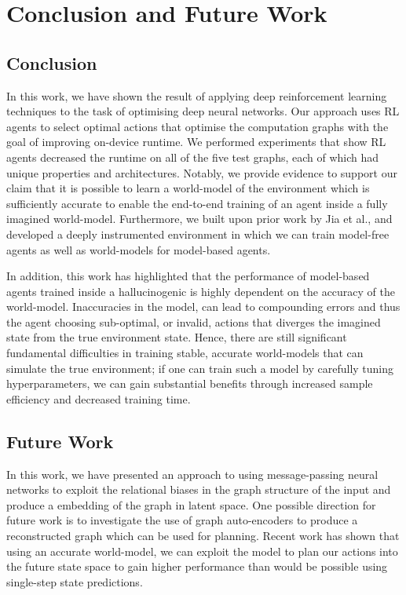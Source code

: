 \chapter{Conclusion and Future Work}

\section{Conclusion}

In this work, we have shown the result of applying deep reinforcement learning techniques to the task of optimising deep neural networks. Our approach uses RL agents to select optimal actions that optimise the computation graphs with the goal of improving on-device runtime. We performed experiments that show RL agents decreased the runtime on all of the five test graphs, each of which had unique properties and architectures. Notably, we provide evidence to support our claim that it is possible to learn a world-model of the environment which is sufficiently accurate to enable the end-to-end training of an agent inside a fully imagined world-model. Furthermore, we built upon prior work by Jia et al., and developed a deeply instrumented environment in which we can train model-free agents as well as world-models for model-based agents.

In addition, this work has highlighted that the performance of model-based agents trained inside a hallucinogenic is highly dependent on the accuracy of the world-model. Inaccuracies in the model, can lead to compounding errors and thus the agent choosing sub-optimal, or invalid, actions that diverges the imagined state from the true environment state. Hence, there are still significant fundamental difficulties in training stable, accurate world-models that can simulate the true environment; if one can train such a model by carefully tuning hyperparameters, we can gain substantial benefits through increased sample efficiency and decreased training time.

\section{Future Work}


In this work, we have presented an approach to using message-passing neural networks to exploit the relational biases in the graph structure of the input and produce a embedding of the graph in latent space. One possible direction for future work is to investigate the use of graph auto-encoders \cite{battaglia2018relational} to produce a reconstructed graph which can be used for planning. Recent work \cite{hafner2018learning, sekar2020planning} has shown that using an accurate world-model, we can exploit the model to plan our actions into the future state space to gain higher performance than would be possible using single-step state predictions.

